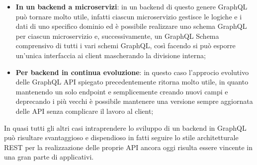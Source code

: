 \begin{itemize}
  \item \textbf{In un backend a microservizi}: in un backend di questo genere GraphQL può tornare molto utile, infatti ciascun microservizio gestisce le logiche e i dati di uno specifico dominio ed è possibile realizzare uno schema GraphQL per ciascun microservizio e, successivamente, un GraphQL Schema comprensivo di tutti i vari schemi GraphQL, così facendo si può esporre un'unica interfaccia ai client mascherando la divisione interna;
  \item \textbf{Per backend in continua evoluzione}: in questo caso l'approcio evolutivo delle GraphQL API spiegato precedentemente ritorna molto utile, in quanto mantenendo un solo endpoint e semplicemente creando nuovi campi e deprecando i più vecchi è possibile mantenere una versione sempre aggiornata delle API senza complicare il lavoro al client;
\end{itemize}
In quasi tutti gli altri casi intraprendere lo sviluppo di un backend in GraphQL può risultare svantaggioso e dispendioso in fatti seguire lo stile architetturale REST per la realizzazione delle proprie API ancora oggi risulta essere vincente in una gran parte di applicativi.
